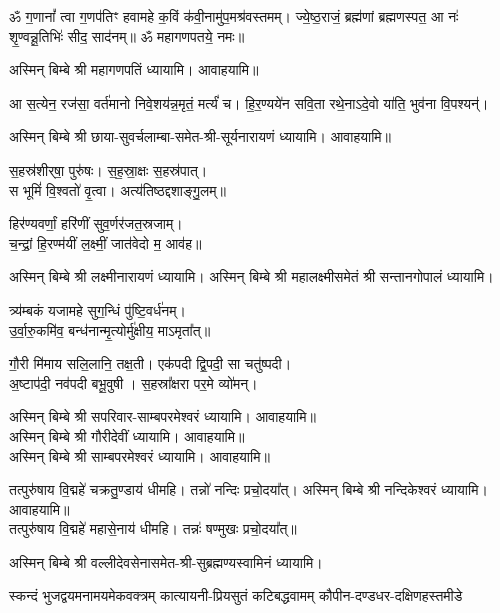 





\begin{center}


ॐ ग॒णानां᳚ त्वा ग॒णप॑तिꣳ हवामहे क॒विं क॑वी॒नामु॑प॒मश्र॑\-वस्तमम्। 
ज्ये॒ष्ठ॒राजं॒ ब्रह्म॑णां ब्रह्मणस्पत॒ आ नः॑ शृ॒ण्वन्नू॒तिभिः॑ सीद॒ साद॑नम्॥ 
ॐ महागणपतये॒ नमः॥ 

अस्मिन् बिम्बे श्री महागणपतिं ध्यायामि। आवाहयामि॥

आ स॒त्येन॒ रज॑सा॒ वर्त॑मानो निवे॒शय॑न्न॒मृतं॒ मर्त्यं॑ च। हि॒र॒ण्यये॑न सवि॒ता रथे॒नाऽदे॒वो या॑ति॒ भुव॑ना वि॒पश्यन्॑।

अस्मिन् बिम्बे श्री छाया-सुवर्चलाम्बा-समेत-श्री-सूर्यनारायणं ध्यायामि। आवाहयामि॥


स॒हस्र॑शीर्‌षा॒ पुरु॑षः। स॒ह॒स्रा॒क्षः स॒हस्र॑पात्।\\
स भूमिं॑ वि॒श्वतो॑ वृ॒त्वा। अत्य॑तिष्ठद्दशाङ्गु॒लम्॥

हिर॑ण्यवर्णां॒ हरि॑णीं सुव॒र्णर॑जत॒स्रजाम्।\\
च॒न्द्रां॒ हि॒रण्म॑यीं ल॒क्ष्मीं॒ जात॑वेदो म॒ आव॑ह॥

अस्मिन् बिम्बे श्री लक्ष्मीनारायणं ध्यायामि।
अस्मिन् बिम्बे श्री महालक्ष्मीसमेतं श्री सन्तानगोपालं ध्यायामि।

त्र्य॑म्बकं यजामहे सुग॒न्धिं पु॑ष्टि॒वर्ध॑नम्।\\
उ॒र्वा॒रु॒कमि॑व॒ बन्ध॑नान्मृ॒त्योर्मु॑क्षीय॒ माऽमृता᳚त्॥

गौ॒री मि॑माय सलि॒लानि॒ तक्ष॒ती। एक॑पदी द्वि॒पदी॒ सा चतु॑ष्पदी।\\
अ॒ष्टाप॑दी॒ नव॑पदी बभू॒वुषी। स॒हस्रा᳚क्षरा पर॒मे व्यो॑मन्।

अस्मिन् बिम्बे श्री सपरिवार-साम्बपरमेश्वरं ध्यायामि। आवाहयामि॥\\
अस्मिन् बिम्बे श्री गौरीदेवीं ध्यायामि। आवाहयामि॥\\
अस्मिन् बिम्बे श्री साम्बपरमेश्वरं ध्यायामि। आवाहयामि॥

तत्पुरु॑षाय वि॒द्महे॑ चक्रतु॒ण्डाय॑ धीमहि। तन्नो॑ नन्दिः प्रचो॒दया᳚त्। 
अस्मिन् बिम्बे श्री नन्दिकेश्वरं ध्यायामि। आवाहयामि॥\\

तत्पुरु॑षाय वि॒द्महे॑ महासे॒नाय॑ धीमहि। तन्नः॑ षण्मुखः प्रचो॒दया᳚त्॥

अस्मिन् बिम्बे श्री वल्लीदेवसेनासमेत-श्री-सुब्रह्मण्यस्वामिनं ध्यायामि। 

{स्कन्दं भुजद्वयमनामयमेकवक्त्रम्}
{कात्यायनी-प्रियसुतं कटिबद्धवामम्}
{कौपीन-दण्डधर-दक्षिणहस्तमीडे}


\end{center}
